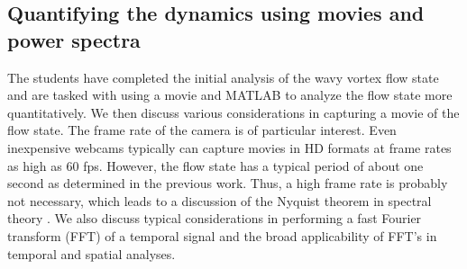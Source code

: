 \documentclass[%
 amsmath,amssymb,
 aps,
floatfix,
aps,prd,longbibliography,
notitlepage
]{revtex4-1}
\begin{document}
\subsection{Quantifying the dynamics using movies and power spectra}%
The students have completed the initial analysis of the wavy vortex flow state and are tasked with using a movie and MATLAB to analyze the flow state more quantitatively. We then discuss various considerations in capturing a movie of the flow state. The frame rate of the camera is of particular interest. Even inexpensive webcams typically can capture movies in HD formats at frame rates as high as 60 fps. However, the flow state has a typical period of about one second as determined in the previous work. Thus, a high frame rate is probably not necessary, which leads to a discussion of the Nyquist theorem in spectral theory \cite{nyquist}. We also discuss typical considerations in performing a fast Fourier transform (FFT) of a temporal signal and the broad applicability of FFT's in temporal and spatial analyses. 
\end{document}
